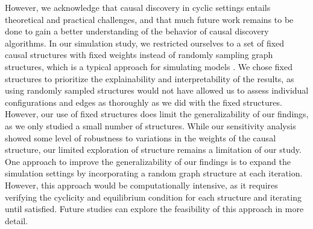 \documentclass[twoside, 11pt]{article}
\begin{document}
However, we acknowledge that causal discovery in cyclic settings entails theoretical and practical challenges, and that much future work remains to be done to gain a better understanding of the behavior of causal discovery algorithms.
In our simulation study, we restricted ourselves to a set of fixed causal structures with fixed weights instead of randomly sampling graph structures, which is a typical approach for simulating models \citep{mooij_joint_2020, strobl2019, diego2012}. We chose fixed structures to prioritize the explainability and interpretability of the results, as using randomly sampled structures would not have allowed us to assess individual configurations and edges as thoroughly as we did with the fixed structures.
However, our use of fixed structures does limit the generalizability of our findings, as we only studied a small number of structures. While our sensitivity analysis showed some level of robustness to variations in the weights of the causal structure, our limited exploration of structure remains a limitation of our study. 
One approach to improve the generalizability of our findings is to expand the simulation settings by incorporating a random graph structure at each iteration. However, this approach would be computationally intensive, as it requires verifying the cyclicity and equilibrium condition for each structure and iterating until satisfied. Future studies can explore the feasibility of this approach in more detail.
\end{document}
